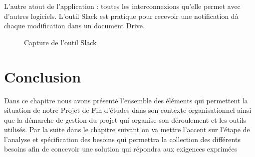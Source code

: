 L'autre atout de l'application : toutes les interconnexions qu'elle permet avec d'autres logiciels. L'outil Slack est pratique pour recevoir une notification d\`a chaque modification dans un document Drive.

\begin{figure}[H]
	\caption{\label{fig:my-label} Capture de l'outil Slack}
\end{figure}

\section{Conclusion}

Dans ce chapitre nous avons pr\'esent\'e l'ensemble des \'el\'ements qui permettent la situation de notre Projet de Fin d'\'etudes dans son contexte organisationnel ainsi que la d\'emarche de gestion du projet qui organise son d\'eroulement et les outils utilis\'es. Par la suite dans le chapitre suivant on va mettre l'accent sur l'\'etape de l'analyse et sp\'ecification des besoins qui permettra la collection des diff\'erents besoins afin de concevoir une solution qui r\'epondra aux exigences exprim\'ees